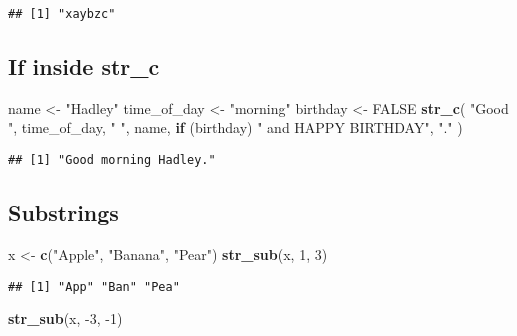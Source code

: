 \documentclass[
]{article}
\newenvironment{Shaded}{\begin{snugshade}}{\end{snugshade}}
\newcommand{\ControlFlowTok}[1]{\textcolor[rgb]{0.13,0.29,0.53}{\textbf{#1}}}
\newcommand{\DecValTok}[1]{\textcolor[rgb]{0.00,0.00,0.81}{#1}}
\newcommand{\KeywordTok}[1]{\textcolor[rgb]{0.13,0.29,0.53}{\textbf{#1}}}
\newcommand{\NormalTok}[1]{#1}
\newcommand{\OtherTok}[1]{\textcolor[rgb]{0.56,0.35,0.01}{#1}}
\newcommand{\StringTok}[1]{\textcolor[rgb]{0.31,0.60,0.02}{#1}}
\begin{document}
\begin{verbatim}
## [1] "xaybzc"
\end{verbatim}

\hypertarget{if-inside-str_c}{%
\subsection{If inside str\_c}\label{if-inside-str_c}}

\begin{Shaded}
\begin{Highlighting}[]
\NormalTok{name \textless{}{-}}\StringTok{ "Hadley"}
\NormalTok{time\_of\_day \textless{}{-}}\StringTok{ "morning"}
\NormalTok{birthday \textless{}{-}}\StringTok{ }\OtherTok{FALSE}
\KeywordTok{str\_c}\NormalTok{(}
\StringTok{"Good "}\NormalTok{, time\_of\_day, }\StringTok{" "}\NormalTok{, name,}
\ControlFlowTok{if}\NormalTok{ (birthday) }\StringTok{" and HAPPY BIRTHDAY"}\NormalTok{,}
\StringTok{"."}
\NormalTok{)}
\end{Highlighting}
\end{Shaded}

\begin{verbatim}
## [1] "Good morning Hadley."
\end{verbatim}

\hypertarget{substrings}{%
\subsection{Substrings}\label{substrings}}

\begin{Shaded}
\begin{Highlighting}[]
\NormalTok{x \textless{}{-}}\StringTok{ }\KeywordTok{c}\NormalTok{(}\StringTok{"Apple"}\NormalTok{, }\StringTok{"Banana"}\NormalTok{, }\StringTok{"Pear"}\NormalTok{)}
\KeywordTok{str\_sub}\NormalTok{(x, }\DecValTok{1}\NormalTok{, }\DecValTok{3}\NormalTok{)}
\end{Highlighting}
\end{Shaded}

\begin{verbatim}
## [1] "App" "Ban" "Pea"
\end{verbatim}

\begin{Shaded}
\begin{Highlighting}[]
\KeywordTok{str\_sub}\NormalTok{(x, }\DecValTok{{-}3}\NormalTok{, }\DecValTok{{-}1}\NormalTok{)}
\end{Highlighting}
\end{Shaded}
\end{document}
